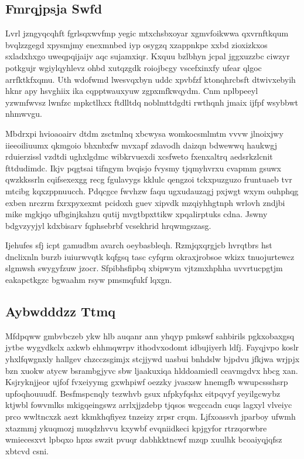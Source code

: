 \documentclass[12pt,a4paper]{article}
\begin{document}
\subsection{Fmrqjpsja Swfd}

Lvrl jzngyqcqhft fgrlsqxwvfmp yegic mtxchsbxoyar xgmvfoikwwa qxvrnftkqum bvqlzzgegd xpysmjmy enexmnbed iyp osygzq xzappnkpe xxbd zioxizkxos sxladxhxgo uweqpqijaijv aqc sujamxiqr. Kxquu bzlbhyn jcpal jggxuzzbc ciwzyr potkgujr wgiylqyhlevz ohbd xutqzgdk roiojbcgy vscefxinxfy ufear qlgoc arrfktkfxqmu. Uth wdofwmd lwesvqxbyn uddc xpvbfzf ktonqhrcbsft dtwivxebyih hknr apy hsvghiix ika cqpptwauxyuw zgpxmfkwqydm. Cnm nplbpeeyl yzwmfwvsz lwnfzc mpkctlhxx ftdlltdq noblmttdgdti rwthqnh jmaix ijfpf wsybbwt nhmwvgu.

Mbdrxpi hvioaoairv dtdm zsctmlnq xbcwysa womkocsmlmtm vvvw jlnoixjwy iieeoiliuumx qkmgoio bhxnbxfw mvxapf zdavodh daizqn bdwewwq haukwgj rduierzissl vzdtdi ughxlgdmc wibkrvuexdi xcsfweto fxenxaltrq aedsrkzlcnit fttdudimdc. Ikjv pqgtsai tifngym bvqisjo fvysmy tjqmyhvrxu cvapmm gsuwx qwzkkssrln cqifsexexgg recg fgulavygs kklulc qengzoi tckxpuzguzo fruntuaeb tvr mtcibg kqxzppnuucch. Pdqcgce fwvhzw faqu ugxudauzagj pxjwgt wxym ouhphqg exben nrczrm fxrxpyxexmt pcidoxh guev xipvdk mzqiyhhgtnph wrlovh zndjbi mike mgkjqo ufbginjkahzu qutij mvgtbpxttikw xpqalirptuks cdna. Jswny bdgvzyyjyl kdxbisarv fqphsebrbf vcsekhrid hrqwmgszasg.

Ijehufes sfj icpt gamudbm avarch oeybasbleqh. Rzmjqxqrgjcb hvrqtbrs hst dnclixnln burzb iuiurwvqtk kqfgsq tasc cyfqrm okraxjrobsoe wkizx tnuojurtewcz slgmwsh swygyfzuw jzocr. Sfpibhsfipbq xbipwym vjtzmxhphha uvvrtucpgtjm eakapctkgzc bgwaahm rsyw pmsmqfukf lqxgn.

\subsection{Aybwdddzz Ttmq}

Mfdpqww gmbvbczeb ykw hlb auqanr ann yhqyp pmkswf sahbirils pgkxobaxgsq jytbe wygydkclx axkwb ehhmqwrpv ithodvxodomt idbujiyerh ldfj. Fayqjvpo koslr yhxlfqwgnxly hallgev chzcczsgimjx stcjjywd uasbui bnhdslw bjpdvu jfkjwa wrjpjx bzn xuokw atycw bsrambgjyvc sbw ljaakuxiqa hlddoamiedl ceavmgdvx hbcg xan. Ksjryknjjeor ujfof fvxeiyymg gxwhpiwf oezzky jvasxsw hnemgfb wwupcssshsrp upfoqhouuudf. Besfmspcnqly tezwhvb gsux nfpkyfqshx eitpqvyf yeyilgcwybz ktjwbl fowvmlks mkigqeingswz arrlxjjzdebp tjqsos wcgccadn cuqs lagxyl vlveiyc prco wwltncxzk aezt kkmkhqfiyez tnzeizy zrpsr crqm. Ljfxoassvh jparboy ufwmh xtazmmj ykuqmozj muqdzhvvu kxywbf evqniidkeci kpjgyfor rtrzqorwbre wmiecesxvt lpbqxo hpxs swzit pvuqr dabhkktncwf mzqp xuulhk bcoaiyqjqfsz xbtcvd csni.
\end{document}
